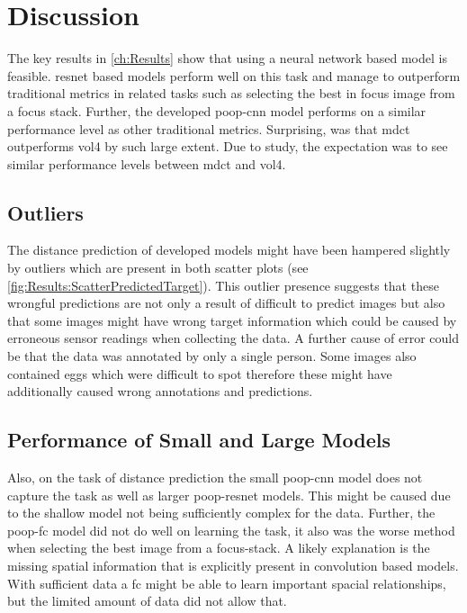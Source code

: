 \chapter{Discussion}
\label{ch:Discussion}

The key results in \autoref{ch:Results} show that using a neural network based model is feasible. \Ac{resnet} based models perform well on this task and manage to outperform traditional metrics in related tasks such as selecting the best in focus image from a focus stack. Further, the developed \ac{poop}-\ac{cnn} model performs on a similar performance level as other traditional metrics. Surprising, was that \ac{mdct} outperforms \ac{vol4} by such large extent. Due to \textcite{mateos-perez2012comparative} study, the expectation was to see similar performance levels between \ac{mdct} and \ac{vol4}.

\section{Outliers}
\label{ch:Discussion:Outliers}

The distance prediction of developed models might have been hampered slightly by outliers which are present in both scatter plots (see \autoref{fig:Results:ScatterPredictedTarget}). This outlier presence suggests that these wrongful predictions are not only a result of difficult to predict images but also that some images might have wrong target information which could be caused by erroneous sensor readings when collecting the data. A further cause of error could be that the data was annotated by only a single person. Some images also contained eggs which were difficult to spot therefore these might have additionally caused wrong annotations and predictions.

\section{Performance of Small and Large Models}
\label{ch:Discussion:SmallandLarge}

Also, on the task of distance prediction the small \ac{poop}-{cnn} model does not capture the task as well as larger \ac{poop}-\ac{resnet} models. This might be caused due to the shallow model not being sufficiently complex for the data. Further, the \ac{poop}-\ac{fc} model did not do well on learning the task, it also was the worse method when selecting the best image from a focus-stack. A likely explanation is the missing spatial information that is explicitly present in convolution based models. With sufficient data a \ac{fc} might be able to learn important spacial relationships, but the limited amount of data did not allow that.

